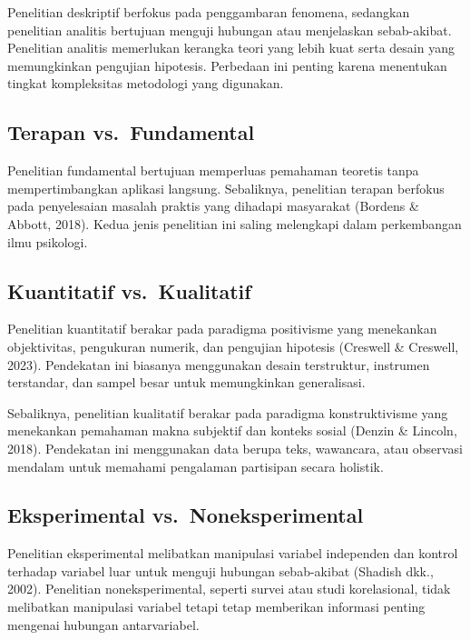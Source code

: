 \documentclass[
  indonesian,
  letterpaper,
  DIV=11,
  numbers=noendperiod]{scrreprt}
\begin{document}
Penelitian deskriptif berfokus pada penggambaran fenomena, sedangkan
penelitian analitis bertujuan menguji hubungan atau menjelaskan
sebab-akibat. Penelitian analitis memerlukan kerangka teori yang lebih
kuat serta desain yang memungkinkan pengujian hipotesis. Perbedaan ini
penting karena menentukan tingkat kompleksitas metodologi yang
digunakan.

\subsection{Terapan vs.~Fundamental}\label{terapan-vs.-fundamental}

Penelitian fundamental bertujuan memperluas pemahaman teoretis tanpa
mempertimbangkan aplikasi langsung. Sebaliknya, penelitian terapan
berfokus pada penyelesaian masalah praktis yang dihadapi masyarakat
(Bordens \& Abbott, 2018). Kedua jenis penelitian ini saling melengkapi
dalam perkembangan ilmu psikologi.

\subsection{Kuantitatif
vs.~Kualitatif}\label{kuantitatif-vs.-kualitatif}

Penelitian kuantitatif berakar pada paradigma positivisme yang
menekankan objektivitas, pengukuran numerik, dan pengujian hipotesis
(Creswell \& Creswell, 2023). Pendekatan ini biasanya menggunakan desain
terstruktur, instrumen terstandar, dan sampel besar untuk memungkinkan
generalisasi.

Sebaliknya, penelitian kualitatif berakar pada paradigma konstruktivisme
yang menekankan pemahaman makna subjektif dan konteks sosial (Denzin \&
Lincoln, 2018). Pendekatan ini menggunakan data berupa teks, wawancara,
atau observasi mendalam untuk memahami pengalaman partisipan secara
holistik.

\subsection{Eksperimental
vs.~Noneksperimental}\label{eksperimental-vs.-noneksperimental}

Penelitian eksperimental melibatkan manipulasi variabel independen dan
kontrol terhadap variabel luar untuk menguji hubungan sebab-akibat
(Shadish dkk., 2002). Penelitian noneksperimental, seperti survei atau
studi korelasional, tidak melibatkan manipulasi variabel tetapi tetap
memberikan informasi penting mengenai hubungan antarvariabel.
\end{document}
